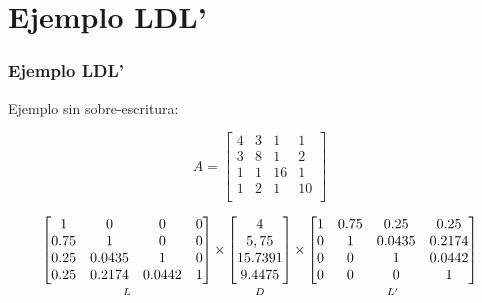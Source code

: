 \documentclass[10pt]{beamer}
\begin{document}
\section{Ejemplo LDL'}
\begin{frame}[fragile]

\frametitle{Ejemplo LDL'} 
Ejemplo sin sobre-escritura:

\[
A=
  \begin{bmatrix}
    4 & 3 & 1 & 1 \\
    3 & 8 & 1 & 2 \\
    1 & 1 & 16 & 1 \\
    1 & 2 & 1 & 10 \\
  \end{bmatrix}
\]

\[
\underbracket[0pt][0pt]{%
\begin{bmatrix}
    1 & 0 & 0 & 0 \\
    0.75 & 1 & 0 & 0 \\
    0.25 & 0.0435 & 1 & 0 \\
    0.25 & 0.2174 & 0.0442 & 1 \\
\end{bmatrix}}_{\mathstrut L}
\times
\underbracket[0pt][0pt]{%
\begin{bmatrix}
    4\\
    5,75\\
    15.7391\\
    9.4475\\
\end{bmatrix}}_{\mathstrut D}
\times
\underbracket[0pt][0pt]{%
\begin{bmatrix}
	1 & 0.75 & 0.25 & 0.25 \\
    0 & 1 & 0.0435 & 0.2174 \\
    0 & 0 & 1 & 0.0442 \\
    0 & 0 & 0 & 1 \\
\end{bmatrix}}_{\mathstrut L'}
\]

\end{frame}
\end{document}
